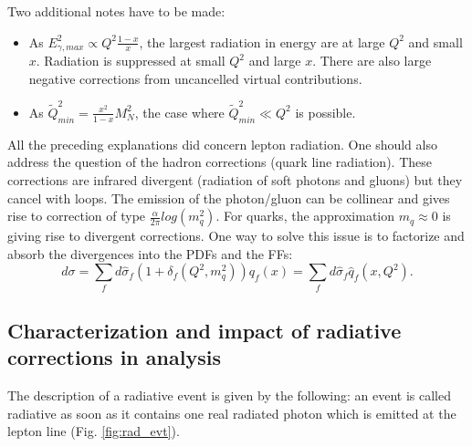 Two additional notes have to be made:
\begin{itemize}
\item As $E^{2}_{\gamma,max} \propto Q^{2}\frac{1-x}{x}$, the largest radiation in energy are at large $Q^{2}$ and small $x$. Radiation is suppressed at small $Q^{2}$ and large $x$. There are also large negative corrections from uncancelled virtual contributions.
\item As $\tilde{Q}^{2}_{min} = \frac{x^{2}}{1-x}M^{2}_{N}$, the case where $\tilde{Q}^{2}_{min} \ll Q^{2}$ is possible.
\end{itemize}

All the preceding explanations did concern lepton radiation. One should also address the question of the hadron corrections (quark line radiation). These corrections are infrared divergent (radiation of soft photons and gluons) but they cancel with loops. The emission of the photon/gluon can be collinear and gives rise to correction of type $\frac{\alpha}{2\pi}log(m_{q}^{2})$. For quarks, the approximation $m_{q} \approx 0$ is giving rise to divergent corrections. One way to solve this issue is to factorize and absorb the divergences into the PDFs and the FFs:
%
\begin{equation}
  d\sigma = \sum_{f}d\hat{\sigma}_{f}(1+\delta_{f}(Q^{2},m^{2}_{q}))q_{f}(x) = \sum_{f}d\hat{\sigma}_{f}\hat{q}_{f}(x,Q^{2}).
\end{equation}

\subsection{Characterization and impact of radiative corrections in analysis}

The description of a radiative event is given by the following: an event is called radiative as soon as it contains one real radiated photon which is emitted at the lepton line (Fig. \ref{fig:rad_evt}).

